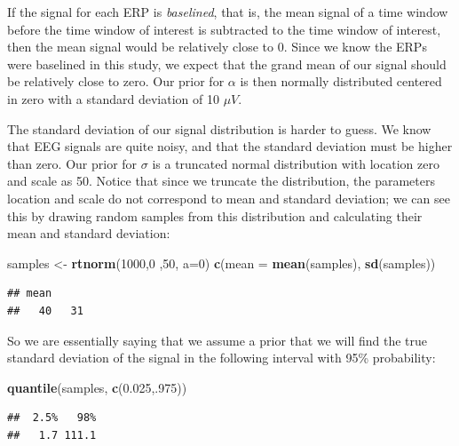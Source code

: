 \documentclass[12pt,]{krantz}
\newenvironment{Shaded}{\begin{snugshade}}{\end{snugshade}}
\newcommand{\DataTypeTok}[1]{\textcolor[rgb]{0.13,0.29,0.53}{#1}}
\newcommand{\DecValTok}[1]{\textcolor[rgb]{0.00,0.00,0.81}{#1}}
\newcommand{\FloatTok}[1]{\textcolor[rgb]{0.00,0.00,0.81}{#1}}
\newcommand{\KeywordTok}[1]{\textcolor[rgb]{0.13,0.29,0.53}{\textbf{#1}}}
\newcommand{\NormalTok}[1]{#1}
\newcommand{\StringTok}[1]{\textcolor[rgb]{0.31,0.60,0.02}{#1}}
\theoremstyle{definition}
\theoremstyle{definition}
\theoremstyle{definition}
\theoremstyle{remark}
\begin{document}
If the signal for each ERP is \emph{baselined}, that is, the mean signal of a time window before the time window of interest is subtracted to the time window of interest, then the mean signal would be relatively close to 0. Since we know the ERPs were baselined in this study, we expect that the grand mean of our signal should be relatively close to zero. Our prior for \(\alpha\) is then normally distributed centered in zero with a standard deviation of 10 \(\mu V\).

The standard deviation of our signal distribution is harder to guess. We know that EEG signals are quite noisy, and that the standard deviation must be higher than zero. Our prior for \(\sigma\) is a truncated normal distribution with location zero and scale as 50. Notice that since we truncate the distribution, the parameters location and scale do not correspond to mean and standard deviation; we can see this by drawing random samples from this distribution and calculating their mean and standard deviation:

\begin{Shaded}
\begin{Highlighting}[]
\NormalTok{samples <-}\StringTok{ }\KeywordTok{rtnorm}\NormalTok{(}\DecValTok{1000}\NormalTok{,}\DecValTok{0}\NormalTok{ ,}\DecValTok{50}\NormalTok{, }\DataTypeTok{a=}\DecValTok{0}\NormalTok{)}
\KeywordTok{c}\NormalTok{(}\DataTypeTok{mean =} \KeywordTok{mean}\NormalTok{(samples), }\KeywordTok{sd}\NormalTok{(samples))}
\end{Highlighting}
\end{Shaded}

\begin{verbatim}
## mean      
##   40   31
\end{verbatim}

So we are essentially saying that we assume a prior that we will find the true standard deviation of the signal in the following interval with 95\% probability:

\begin{Shaded}
\begin{Highlighting}[]
\KeywordTok{quantile}\NormalTok{(samples, }\KeywordTok{c}\NormalTok{(}\FloatTok{0.025}\NormalTok{,.}\DecValTok{975}\NormalTok{))}
\end{Highlighting}
\end{Shaded}

\begin{verbatim}
##  2.5%   98% 
##   1.7 111.1
\end{verbatim}
\end{document}
